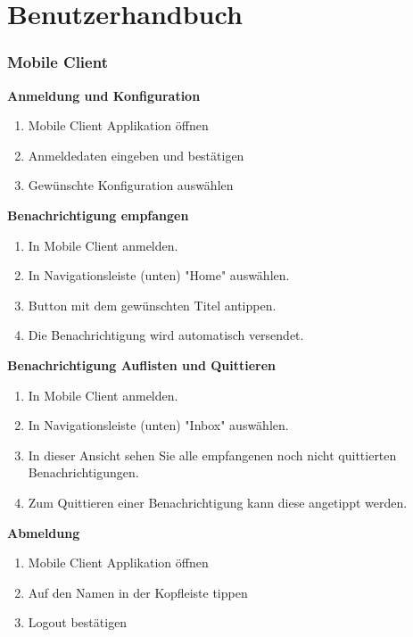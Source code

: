 \section{Benutzerhandbuch}

\subsubsection*{Mobile Client}

\textbf{Anmeldung und Konfiguration}

\begin{enumerate}
    \item Mobile Client Applikation öffnen
    \item Anmeldedaten eingeben und bestätigen
    \item Gewünschte Konfiguration auswählen
\end{enumerate}

\textbf{Benachrichtigung empfangen}

\begin{enumerate}
    \item In Mobile Client anmelden.
    \item In Navigationsleiste (unten) "Home" auswählen.
    \item Button mit dem gewünschten Titel antippen.
    \item Die Benachrichtigung wird automatisch versendet.
\end{enumerate}

\textbf{Benachrichtigung Auflisten und Quittieren}

\begin{enumerate}
    \item In Mobile Client anmelden.
    \item In Navigationsleiste (unten) "Inbox" auswählen.
    \item In dieser Ansicht sehen Sie alle empfangenen noch nicht quittierten Benachrichtigungen.
    \item Zum Quittieren einer Benachrichtigung kann diese angetippt werden.
\end{enumerate}

\textbf{Abmeldung}

\begin{enumerate}
    \item Mobile Client Applikation öffnen
    \item Auf den Namen in der Kopfleiste tippen
    \item Logout bestätigen
\end{enumerate}

